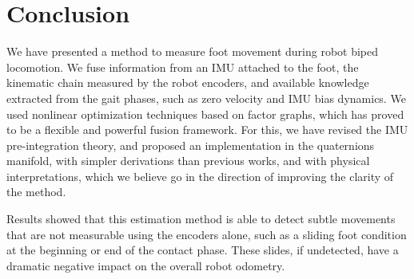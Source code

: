 
\section{Conclusion}

We have presented a method to measure foot movement during robot biped locomotion. We fuse information from an IMU attached to the foot, the kinematic chain measured by the robot encoders, and available knowledge extracted from the gait phases, such as zero velocity and IMU bias dynamics. We used nonlinear optimization techniques based on factor graphs, which has proved to be a flexible and powerful fusion framework. For this, we have revised the IMU pre-integration theory, and proposed an implementation in the quaternions manifold, with simpler derivations than previous works, and with physical interpretations, which we believe go in the direction of improving the clarity of the method.


Results showed that this estimation method is able to detect subtle movements that are not measurable using the encoders alone, such as a sliding foot condition at the beginning or end of the contact phase. These slides, if undetected, have a dramatic negative impact on the overall robot odometry.
